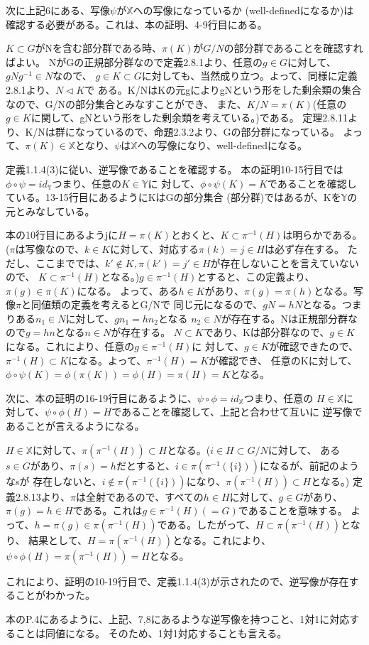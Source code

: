 \documentclass{jsarticle}
\begin{document}
次に上記6にある、写像$\psi$が$\mathbb{X}$への写像になっているか
(well-definedになるか)は確認する必要がある。これは、本の証明、4-9行目にある。

$K \subset G$がNを含む部分群である時、$\pi(K)$が$G/N$の部分群であることを確認すればよい。
NがGの正規部分群なので定義2.8.1より、任意の$g \in G$に対して、$gNg^{-1} \in N$なので、
$g \in K \subset G$に対しても、当然成り立つ。よって、同様に定義2.8.1より、$N \triangleleft K$で
ある。K/NはKの元gによりgNという形をした剰余類の集合なので、G/Nの部分集合とみなすことができ、
また、$K/N = \pi(K)$(任意の$g \in K$に関して、gNという形をした剰余類を考えている。)である。
定理2.8.11より、K/Nは群になっているので、命題2.3.2より、Gの部分群になっている。
よって、$\pi(K) \in \mathbb{X}$となり、$\psi$は$\mathbb{X}$への写像になり、well-definedになる。

定義1.1.4(3)に従い、逆写像であることを確認する。
本の証明10-15行目では$\phi \circ \psi = id_{\mathbb{Y}}$つまり、任意の$K \in \mathbb{Y}$に
対して、$\phi \circ \psi(K) = K$であることを確認している。13-15行目にあるようにKはGの部分集合
(部分群)ではあるが、Kを$\mathbb{Y}$の元とみなしている。

本の10行目にあるようjに$H = \pi(K) $とおくと、$K \subset \pi^{-1}(H)$は明らかである。
($\pi$は写像なので、$k \in K$に対して、対応する$\pi(k) = j \in H$は必ず存在する。
ただし、ここまででは、$k' \notin K, \pi(k') = j' \in H$が存在しないことを言えていないので、
$K \subset \pi^{-1}(H)$となる。)$g \in \pi^{-1}(H)$とすると、この定義より、$\pi(g) \in \pi(K)$になる。
よって、ある$h \in K$があり、$\pi(g) = \pi(h)$となる。写像$\pi$と同値類の定義を考えるとG/Nで
同じ元になるので、$gN = hN$となる。つまりある$n_1 \in N$に対して、$g n_1 = h n_2$となる
$n_2 \in N$が存在する。Nは正規部分群なので$g = h n$となる$n \in N$が存在する。
$N \subset K$であり、Kは部分群なので、$g \in K$になる。これにより、任意の$g \in \pi^{-1}(H)$に
対して、$g \in K$が確認できたので、$\pi^{-1}(H) \subset K$になる。よって、$\pi^{-1}(H) = K$が確認でき、
任意のKに対して、$\phi \circ \psi(K) = \phi(\pi(K)) = \phi(H) = \pi(H) = K$となる。

次に、本の証明の16-19行目にあるように、$\psi \circ \phi = id_{\mathbb{X}}$つまり、任意の
$H \in \mathbb{X}$に対して、$\psi \circ \phi(H) = H$であることを確認して、上記と合わせて互いに
逆写像であることが言えるようになる。

$H \in \mathbb{X}$に対して、$\pi(\pi^{-1}(H)) \subset H$となる。($i \in H \subset G/N$に対して、
ある$s \in G$があり、$\pi(s) = h$だとすると、$i \in \pi(\pi^{-1}(\{i\}))$になるが、前記のようなsが
存在しないと、$i \notin \pi(\pi^{-1}(\{i\}))$になり、$\pi(\pi^{-1}(H)) \subset H$となる。)
定義2.8.13より、$\pi$は全射であるので、すべての$h \in H$に対して、$g \in G$があり、
$\pi(g) = h \in H$である。これは$g \in \pi^{-1}(H) (=G)$であることを意味する。
よって、$h = \pi(g) \in \pi(\pi^{-1}(H))$である。したがって、$H \subset \pi(\pi^{-1}(H))$となり、
結果として、$H = \pi(\pi^{-1}(H))$となる。これにより、$\psi \circ \phi(H) = \pi(\pi^{-1}(H)) = H$となる。

これにより、証明の10-19行目で、定義1.1.4(3)が示されたので、逆写像が存在することがわかった。

本のP.4にあるように、上記、7,8にあるような逆写像を持つこと、1対1に対応することは同値になる。
そのため、1対1対応することも言える。
\end{document}
